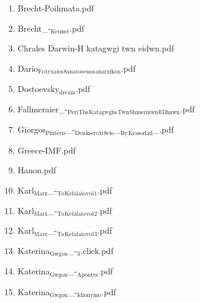 \documentclass[11pt]{article}
\begin{document}
\begin{enumerate}
\begin{enumerate}
\item Brecht-Poihmata.pdf
\label{sec-1-1-1-1-49-2-2-1-11}

\item Brecht\_-$_{\text{Keuner}}$.pdf
\label{sec-1-1-1-1-49-2-2-1-12}

\item Chrales Darwin-H katagwgi twn eidwn.pdf
\label{sec-1-1-1-1-49-2-2-1-13}

\item Dario$_{\text{Fo}}$$_{\text{tyxaios}}$$_{\text{8anatos}}$$_{\text{enos}}$$_{\text{anarxikou}}$.pdf
\label{sec-1-1-1-1-49-2-2-1-14}

\item Dostoevsky$_{\text{dream}}$.pdf
\label{sec-1-1-1-1-49-2-2-1-15}

\item Fallmeraier\_-$_{\text{Peri}}$$_{\text{Ths}}$$_{\text{Katagwghs}}$$_{\text{Twn}}$$_{\text{Shmerinwn}}$$_{\text{Ellhnwn}}$.pdf
\label{sec-1-1-1-1-49-2-2-1-16}

\item Giorgos$_{\text{Pinteris}}$\_-$_{\text{Den}}$$_{\text{ksero}}$$_{\text{ti}}$$_{\text{8elo}}$\_$_{\text{By}}$$_{\text{Krasodad}}$\_.pdf
\label{sec-1-1-1-1-49-2-2-1-17}

\item Greece-IMF.pdf
\label{sec-1-1-1-1-49-2-2-1-18}

\item Hanon.pdf
\label{sec-1-1-1-1-49-2-2-1-19}

\item Karl$_{\text{Marx}}$\_-$_{\text{To}}$$_{\text{Kefalaio}}$$_{\text{vol}}$$_{\text{1}}$.pdf
\label{sec-1-1-1-1-49-2-2-1-20}

\item Karl$_{\text{Marx}}$\_-$_{\text{To}}$$_{\text{Kefalaio}}$$_{\text{vol}}$$_{\text{2}}$.pdf
\label{sec-1-1-1-1-49-2-2-1-21}

\item Karl$_{\text{Marx}}$\_-$_{\text{To}}$$_{\text{Kefalaio}}$$_{\text{vol}}$$_{\text{3}}$.pdf
\label{sec-1-1-1-1-49-2-2-1-22}

\item Katerina$_{\text{Gwgou}}$\_-$_{\text{3}}$.click.pdf
\label{sec-1-1-1-1-49-2-2-1-23}

\item Katerina$_{\text{Gwgou}}$\_-$_{\text{Apontes}}$.pdf
\label{sec-1-1-1-1-49-2-2-1-24}

\item Katerina$_{\text{Gwgou}}$\_-$_{\text{Idionymo}}$.pdf
\label{sec-1-1-1-1-49-2-2-1-25}


\end{enumerate}
\end{enumerate}
\end{document}
